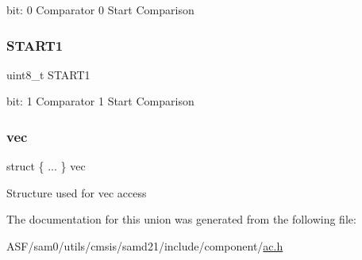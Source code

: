 bit\+: 0 Comparator 0 Start Comparison \mbox{\label{union_a_c___c_t_r_l_b___type_abd0c4b74d64ce7071cb929b2e0f5ac8a}} 
\subsubsection{\texorpdfstring{START1}{START1}}
{\footnotesize\ttfamily uint8\+\_\+t S\+T\+A\+R\+T1}

bit\+: 1 Comparator 1 Start Comparison \mbox{\label{union_a_c___c_t_r_l_b___type_a9f5d16a6bb3b48b0c78f2ffc386649ad}} 
\subsubsection{\texorpdfstring{vec}{vec}}
{\footnotesize\ttfamily struct \{ ... \}   vec}

Structure used for vec access 

The documentation for this union was generated from the following file\+:\begin{DoxyCompactItemize}
\item 
A\+S\+F/sam0/utils/cmsis/samd21/include/component/\mbox{\hyperlink{component_2ac_8h}{ac.\+h}}\end{DoxyCompactItemize}
